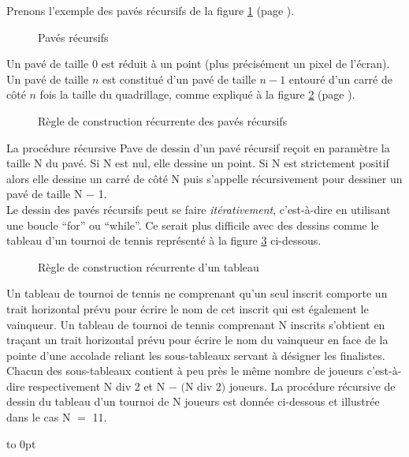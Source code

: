 Prenons l'exemple des pavés récursifs
de la figure \ref{fig:pavec} (page \pageref{fig:pavec}).
\begin{figure}[htbp]
 \caption{Pavés récursifs}\label{fig:pavec}
\end{figure}
Un pavé de taille 0 est réduit à un point (plus précisément un pixel de l'écran).
Un pavé de taille $n$ est constitué d'un pavé de taille $n - 1$
entouré d'un carré de côté $n$ fois la taille du quadrillage, comme expliqué à la
figure \ref{fig:indpavec} (page \pageref{fig:indpavec}).
\begin{figure}[htbp]
 \caption{Règle de construction récurrente des pavés récursifs}\label{fig:indpavec}
\end{figure}
La procédure récursive {\idt Pave} de dessin d'un pavé récursif reçoit en paramètre la taille {\idt N}
du pavé. Si {\idt N} est nul, elle dessine un point. Si {\idt N} est strictement positif alors
elle dessine un carré de côté {\idt N} puis s'appelle récursivement pour dessiner un
pavé de taille {\idt N $-$ 1}.
\ \\

Le dessin des pavés récursifs peut se faire {\em itérativement}, c'est-à-dire en utilisant 
une boucle ``for'' ou ``while''. Ce serait plus difficile avec des dessins comme le tableau d'un tournoi
de tennis représenté à la figure \ref{fig:tabtour} ci-dessous.
\begin{figure}[htbp]
 \caption{Règle de construction récurrente d'un tableau\label{fig:tabtour}}
\end{figure}

Un tableau de tournoi de tennis ne comprenant qu'un seul inscrit comporte un trait horizontal
prévu pour écrire le nom de cet inscrit qui est également le vainqueur. Un tableau de tournoi de 
tennis comprenant {\idt N} ins\-crits s'obtient en traçant un trait horizontal
prévu pour écrire le nom du vainqueur en face de la pointe d'une accolade reliant les 
sous-tableaux servant à désigner les finalistes. Chacun des sous-tableaux contient à peu près
le même nombre de joueurs c'est-à-dire respectivement {\idt N {\mcl div} 2} et
{\idt N $-$ $($N {\mcl div} 2$)$} joueurs. La procédure récursive de dessin du tableau d'un 
tournoi de {\idt N} joueurs est donnée ci-dessous et illustrée dans le cas {\idt N $=$ 11}.

 {
 \vbox to 0pt{\vspace*{3cm}}%
 
 }
